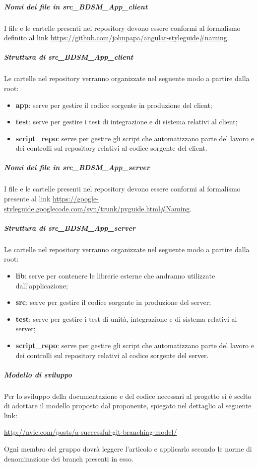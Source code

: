 				\subparagraph{Nomi dei file in src\_BDSM\_App\_client}
				I file e le cartelle presenti nel repository devono essere conformi al formalismo definito al link \url{https://github.com/johnpapa/angular-styleguide#naming}.

				\subparagraph{Struttura di src\_BDSM\_App\_client}
				Le cartelle nel repository verranno organizzate nel seguente modo a partire dalla root:
					\begin{itemize}
						\item \textbf{app}: serve per gestire il codice sorgente in produzione del client;
						\item \textbf{test}: serve per gestire i test di integrazione e di sistema relativi al client;
						\item \textbf{script\_repo}: serve per gestire gli script che automatizzano parte del lavoro e dei controlli sul repository relativi al codice sorgente del client.
					\end{itemize}

				\subparagraph{Nomi dei file in src\_BDSM\_App\_server}
				I file e le cartelle presenti nel repository devono essere conformi al formalismo presente al link \url{https://google-styleguide.googlecode.com/svn/trunk/pyguide.html#Naming}.

				\subparagraph{Struttura di src\_BDSM\_App\_server}
				Le cartelle nel repository verranno organizzate nel seguente modo a partire dalla root:
				\begin{itemize}
					\item \textbf{lib}: serve per contenere le librerie esterne che andranno utilizzate dall'applicazione;
					\item \textbf{src}: serve per gestire il codice sorgente in produzione del server;
					\item \textbf{test}: serve per gestire i test di unità, integrazione e di sistema relativi al server;
					\item \textbf{script\_repo}: serve per gestire gli script che automatizzano parte del lavoro e dei controlli sul repository relativi al codice sorgente del server.
				\end{itemize}




				\subparagraph{Modello di sviluppo}
				Per lo sviluppo della documentazione e del codice necessari al progetto si è scelto di adottare il modello proposto dal proponente, spiegato nel dettaglio al seguente link:
					\begin{center}
						\url{http://nvie.com/posts/a-successful-git-branching-model/}
					\end{center}
					Ogni membro del gruppo dovrà leggere l'articolo e applicarlo secondo le norme di denominazione dei branch presenti in esso.

